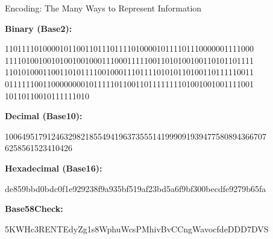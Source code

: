 \documentclass[handout]{beamer}
\begin{document}
\begin{frame}{Encoding: The Many Ways to Represent Information}
	
	\textbf{Binary (Base2):} 
	\begin{footnotesize}
		11011110100001011001101110111101000010111101110000001111000
		11110100100101001001000111000111110011010100100110101101111
		11010100011001101011110010001110111101010110100110111110011
		01111110011000000001011111011001101111111101001001001111001
		10110110010111111010
	\end{footnotesize}
	
	\vspace{0.2em}
	
	\textbf{Decimal (Base10):} 
	\begin{footnotesize}
		10064951791246329821855494196373555141999091939477580894366707
		6258561523410426
	\end{footnotesize}
	
	\vspace{0.2em}
	
	\textbf{Hexadecimal (Base16):} 
	\begin{footnotesize}
		de859bbd0bdc0f1e929238f9a935bf519af23bd5a6f9bf300becdfe9279b65fa
	\end{footnotesize}
	
	\vspace{0.2em}
	
	\textbf{Base58Check:} 
	\begin{footnotesize}
		5KWHc3RENTEdyZg1s8WphuWcsPMhivBvCCngWavocfdeDDD7DVS
	\end{footnotesize}
\end{frame}
\end{document}
